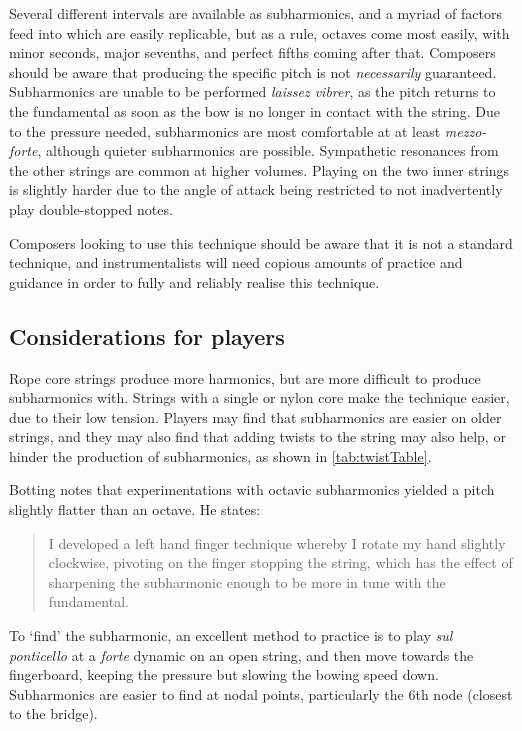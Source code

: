 Several different intervals are available as subharmonics, and a myriad of factors feed into which are easily replicable, but as a rule, octaves come most easily, with minor seconds, major sevenths, and perfect fifths coming after that.
Composers should be aware that producing the specific pitch is not \emph{necessarily} guaranteed.
Subharmonics are unable to be performed \emph{laissez vibrer}, as the pitch returns to the fundamental as soon as the bow is no longer in contact with the string.\autocite[]{appleseedFeedbackExploratorySession2019}
Due to the pressure needed, subharmonics are most comfortable at at least \emph{mezzo-forte}, although quieter subharmonics are possible. 
Sympathetic resonances from the other strings are common at higher volumes.
Playing on the two inner strings is slightly harder due to the angle of attack being restricted to not inadvertently play double-stopped notes.\autocite[99]{welbanksFoundationsModernCello}



Composers looking to use this technique should be aware that it is not a standard technique, and instrumentalists will need copious amounts of practice and guidance in order to fully and reliably realise this technique.

\subsection{Considerations for players}
Rope core strings produce more harmonics, but are more difficult to produce subharmonics with.
Strings with a single or nylon core make the technique easier, due to their low tension.\autocite[99]{welbanksFoundationsModernCello}
Players may find that subharmonics are easier on older strings, and they may also find that adding twists to the string may also help, or hinder the production of subharmonics, as shown in \autoref{tab:twistTable}.\autocite[]{kimuraHowProduceSubharmonics1999}


Botting notes that experimentations with octavic subharmonics yielded a pitch slightly flatter than an octave. He states: \begin{quotation}
  I developed a left hand finger technique whereby I rotate my hand slightly clockwise, pivoting on the finger stopping the string, which has the effect of sharpening the subharmonic enough to be more in tune with the fundamental.\autocite[111]{bottingDevelopingPersonalVocabulary2019}
\end{quotation}

To `find' the subharmonic, an excellent method to practice is to play \emph{sul ponticello} at a \emph{forte} dynamic on an open string, and then move towards the fingerboard, keeping the pressure but slowing the bowing speed down.
Subharmonics are easier to find at nodal points, particularly the 6th node (closest to the bridge).\autocite[]{appleseedFeedbackSightreadingSession2019}

